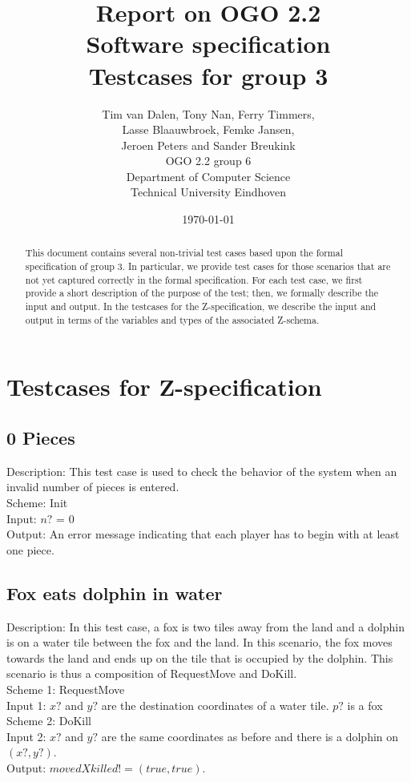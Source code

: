 \documentclass[a4paper,11pt]{article}
\title{Report on OGO 2.2 \\ Software specification\\ Testcases for group 3}
\author{
        Tim van Dalen, Tony Nan, Ferry Timmers, \\ Lasse Blaauwbroek, Femke Jansen, \\Jeroen Peters and Sander Breukink\\ OGO 2.2 group 6 \\
                Department of Computer Science\\
        Technical University Eindhoven\\
}
\date{\today}
\begin{document}
\maketitle

\begin{abstract}
This document contains several non-trivial test cases based upon the formal specification of group 3. In particular, we provide test cases for those scenarios that are not yet captured correctly in the formal specification. For each test case, we first provide a short description of the purpose of the test; then, we formally describe the input and output. In the testcases for the Z-specification, we describe the input and output in terms of the variables and types of the associated Z-schema.
\end{abstract}

    \section{Testcases for Z-specification}

\subsection{0 Pieces}
    Description: This test case is used to check the behavior of the system when an invalid number of pieces is entered. \\
    Scheme: Init\\
    Input: $n?$ = 0 \\
    Output: An error message indicating that each player has to begin with at least one piece.

\subsection{Fox eats dolphin in water}
    Description: In this test case, a fox is two tiles away from the land and a dolphin is on a water tile between the fox and the land. In this scenario, the fox moves towards the land and ends up on the tile that is occupied by the dolphin. This scenario is thus a composition of RequestMove and DoKill. \\
    Scheme 1: RequestMove \\
    Input 1: $x?$ and $y?$ are the destination coordinates of a water tile. $p?$ is a fox\\
    Scheme 2: DoKill\\
    Input 2: $x?$ and $y?$ are the same coordinates as before and there is a dolphin on $(x?,y?)$.\\
    Output: $movedXkilled! = (true,true)$.\\
\end{document}
